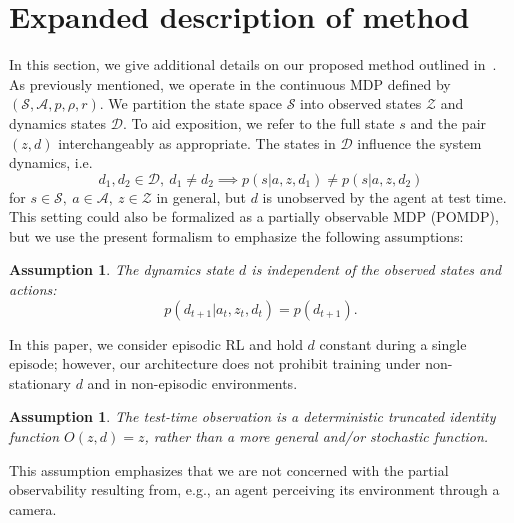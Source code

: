 \documentclass{article}
\newcommand{\cA}{\mathcal{A}}
\newcommand{\cS}{\mathcal{S}}
\newcommand{\obset}{\mathcal{Z}}
\newcommand{\idset}{\mathcal{D}}
\newcommand{\obvar}{z}
\newcommand{\idvar}{d}
\newtheorem{assumption}[theorem]{Assumption}
\begin{document}

{}

\newpage
\appendix

\section{Expanded description of method}

In this section, we give additional details on our proposed method outlined in~.
As previously mentioned, we operate in the continuous MDP defined by $(\cS, \cA, p, \rho, r)$.
We partition the state space $\cS$ into observed states $\obset$ and dynamics states $\idset$.
To aid exposition, we refer to the full state $s$ and the pair $(\obvar, \idvar)$ interchangeably as appropriate.
The states in $\idset$ influence the system dynamics, i.e.
\begin{equation}
\idvar_1, \idvar_2 \in \idset,\ \idvar_1 \neq \idvar_2 \implies p(s|a,\obvar,\idvar_1) \neq p(s|a,\obvar,\idvar_2)
\end{equation}
for $s \in \cS,\ a \in \cA,\ \obvar \in \obset$ in general,
but $\idvar$ is unobserved by the agent at test time.
This setting could also be formalized as a partially observable MDP (POMDP),
but we use the present formalism to emphasize the following assumptions:
\begin{assumption}
The dynamics state $d$ is independent of the observed states and actions:
\[
p(\idvar_{t+1}|a_t, \obvar_t, \idvar_t) = p(\idvar_{t+1}).
\]
\end{assumption}
In this paper, we consider episodic RL and hold $\idvar$ constant during a single episode;
however, our architecture does not prohibit training under non-stationary $\idvar$ and in non-episodic environments.
\begin{assumption}
The test-time observation is a deterministic truncated identity function $O(\obvar, \idvar) = \obvar$,
rather than a more general and/or stochastic function.
\label{observation}
\end{assumption}
This assumption emphasizes that we are not concerned with the partial observability resulting from, e.g.,
an agent perceiving its environment through a camera.
\end{document}
